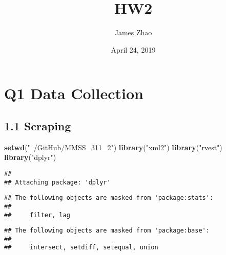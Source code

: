 \documentclass[]{article}
\title{HW2}
\author{James Zhao}
\date{April 24, 2019}
\newenvironment{Shaded}{\begin{snugshade}}{\end{snugshade}}
\newcommand{\KeywordTok}[1]{\textcolor[rgb]{0.13,0.29,0.53}{\textbf{#1}}}
\newcommand{\StringTok}[1]{\textcolor[rgb]{0.31,0.60,0.02}{#1}}
\newcommand{\OperatorTok}[1]{\textcolor[rgb]{0.81,0.36,0.00}{\textbf{#1}}}
\newcommand{\NormalTok}[1]{#1}
\begin{document}
\maketitle

\section{Q1 Data Collection}\label{q1-data-collection}

\subsection{1.1 Scraping}\label{scraping}

\begin{Shaded}
\begin{Highlighting}[]
\KeywordTok{setwd}\NormalTok{(}\StringTok{"~/GitHub/MMSS_311_2"}\NormalTok{)}
\KeywordTok{library}\NormalTok{(}\StringTok{"xml2"}\NormalTok{)}
\KeywordTok{library}\NormalTok{(}\StringTok{"rvest"}\NormalTok{)}
\KeywordTok{library}\NormalTok{(}\StringTok{"dplyr"}\NormalTok{)}
\end{Highlighting}
\end{Shaded}

\begin{verbatim}
## 
## Attaching package: 'dplyr'
\end{verbatim}

\begin{verbatim}
## The following objects are masked from 'package:stats':
## 
##     filter, lag
\end{verbatim}

\begin{verbatim}
## The following objects are masked from 'package:base':
## 
##     intersect, setdiff, setequal, union
\end{verbatim}

\begin{Shaded}
\end{Shaded}
\end{document}
